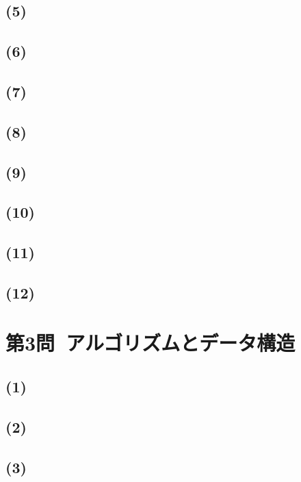 \documentclass[a4paper,12pt,xelatex,ja=standard]{bxjsarticle}
\begin{document}
\subsection*{(5)}

\subsection*{(6)}

\subsection*{(7)}

\subsection*{(8)}

\subsection*{(9)}

\subsection*{(10)}

\subsection*{(11)}

\subsection*{(12)}

\section*{第3問\ アルゴリズムとデータ構造}
\subsection*{(1)}

\subsection*{(2)}

\subsection*{(3)}
\end{document}
